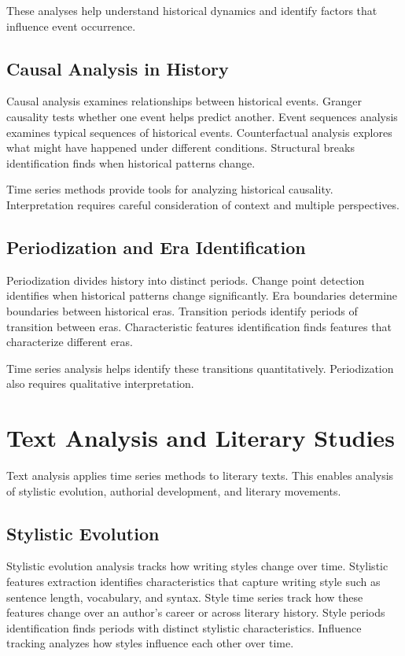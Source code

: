 These analyses help understand historical dynamics and identify factors that influence event occurrence.

\subsection{Causal Analysis in History}

Causal analysis examines relationships between historical events. Granger causality tests whether one event helps predict another. Event sequences analysis examines typical sequences of historical events. Counterfactual analysis explores what might have happened under different conditions. Structural breaks identification finds when historical patterns change.

Time series methods provide tools for analyzing historical causality. Interpretation requires careful consideration of context and multiple perspectives.

\subsection{Periodization and Era Identification}

Periodization divides history into distinct periods. Change point detection identifies when historical patterns change significantly. Era boundaries determine boundaries between historical eras. Transition periods identify periods of transition between eras. Characteristic features identification finds features that characterize different eras.

Time series analysis helps identify these transitions quantitatively. Periodization also requires qualitative interpretation.

\section{Text Analysis and Literary Studies}

Text analysis applies time series methods to literary texts. This enables analysis of stylistic evolution, authorial development, and literary movements.

\subsection{Stylistic Evolution}

Stylistic evolution analysis tracks how writing styles change over time. Stylistic features extraction identifies characteristics that capture writing style such as sentence length, vocabulary, and syntax. Style time series track how these features change over an author's career or across literary history. Style periods identification finds periods with distinct stylistic characteristics. Influence tracking analyzes how styles influence each other over time.

